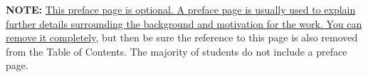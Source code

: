 \textbf{NOTE:} \uline{This preface page is optional.  A preface page is usually
used to explain further details surrounding the background and motivation for
the work.  You can remove it completely}, but then be sure the reference to
this page is also removed from the Table of Contents.  The majority of students
do not include a preface page.




